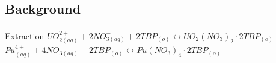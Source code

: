\documentclass{beamer}
\newcommand{\tss}{\textsuperscript}
\begin{document}
\subsection{Background}



\begin{frame}{Extraction}
  $UO_{2(aq)}^{2+}+2NO^{-}_{3(aq)}+2TBP_{(o)}
  \leftrightarrow UO_2(NO_3)_2\cdot2TBP_{(o)}$\tss{\cite{benedict1982nuclear}}
  $Pu^{4+}_{(aq)}+4NO^{-}_{3(aq)}+2TBP_{(o)}
  \leftrightarrow Pu(NO_3)_4\cdot 2TBP_{(o)}$
  \vspace{-3mm}
  \begin{figure} \centering
    \vspace*{0.1cm}
\end{figure}
\end{frame}
\end{document}
